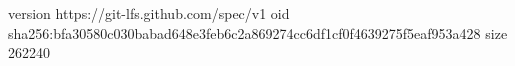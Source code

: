 version https://git-lfs.github.com/spec/v1
oid sha256:bfa30580c030babad648e3feb6c2a869274cc6df1cf0f4639275f5eaf953a428
size 262240
